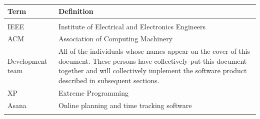 \documentclass[]{article}
\begin{document}
\begin{longtable}[c]{@{}ll@{}}
\toprule\addlinespace
\begin{minipage}[t]{0.47\columnwidth}\raggedright
Term
\end{minipage} & \begin{minipage}[t]{0.47\columnwidth}\raggedright
Definition
\end{minipage}
\\
\hline
\\\addlinespace
\begin{minipage}[t]{0.47\columnwidth}\raggedright
IEEE
\end{minipage} & \begin{minipage}[t]{0.47\columnwidth}\raggedright
Institute of Electrical and Electronics Engineers
\end{minipage}
\\\addlinespace
\begin{minipage}[t]{0.47\columnwidth}\raggedright
ACM
\end{minipage} & \begin{minipage}[t]{0.47\columnwidth}\raggedright
Association of Computing Machinery
\end{minipage}
\\\addlinespace
\begin{minipage}[t]{0.47\columnwidth}\raggedright
Development team
\end{minipage} & \begin{minipage}[t]{0.47\columnwidth}\raggedright
All of the individuals whose names appear on the cover of this document.
These persons have collectively put this document together and will
collectively implement the software product described in subsequent
sections.
\end{minipage}
\\\addlinespace
\begin{minipage}[t]{0.47\columnwidth}\raggedright
XP
\end{minipage} & \begin{minipage}[t]{0.47\columnwidth}\raggedright
Extreme Programming
\end{minipage}
\\\addlinespace
\begin{minipage}[t]{0.47\columnwidth}\raggedright
Asana
\end{minipage} & \begin{minipage}[t]{0.47\columnwidth}\raggedright
Online planning and time tracking software
\end{minipage}
\\\addlinespace

\end{longtable}
\end{document}
